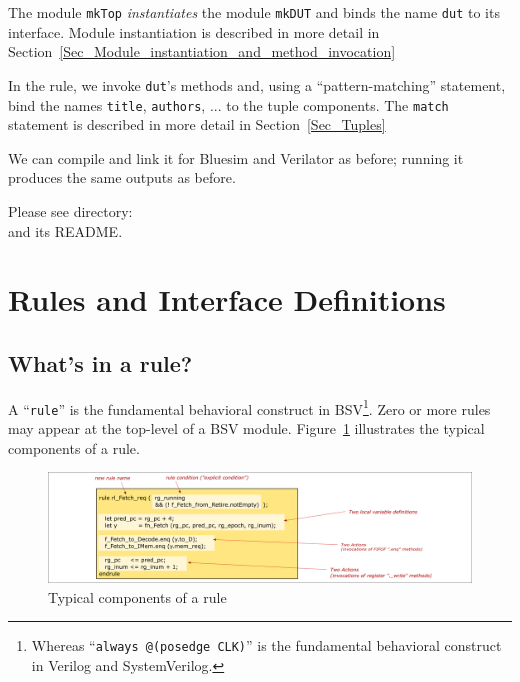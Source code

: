 The module \verb|mkTop| \emph{instantiates} the module \verb|mkDUT|
and binds the name \verb|dut| to its interface.  Module instantiation
is described in more detail in
Section~\ref{Sec_Module_instantiation_and_method_invocation}

In the rule, we invoke \verb|dut|'s methods and, using a
``pattern-matching'' statement, bind the names \verb|title|,
\verb|authors|, ... {\etc} to the tuple components. The \verb|match|
statement is described in more detail in Section~\ref{Sec_Tuples}

We can compile and link it for Bluesim and Verilator as before;
running it produces the same outputs as before.

\Beginexercise

Please see directory:  \\
and its README.
\Endexercise


\section{Rules and Interface Definitions}

\label{Sec_Rules_and_Interface_Defs}


\subsection{What's in a rule?}


A ``\verb|rule|'' is the fundamental behavioral construct in
BSV\footnote{Whereas ``{\tt always @(posedge CLK)}'' is the
fundamental behavioral construct in Verilog and SystemVerilog.}. Zero
or more rules may appear at the top-level of a BSV module.
Figure~\ref{Fig_BSV_whats_in_a_rule} illustrates the typical
components of a rule.

\begin{figure}[htbp]
  \centerline{\includegraphics[width=6in,angle=0]{Figures/Fig_BSV_whats_in_a_rule}}
  \caption{\label{Fig_BSV_whats_in_a_rule}
           Typical components of a rule}
\end{figure}


